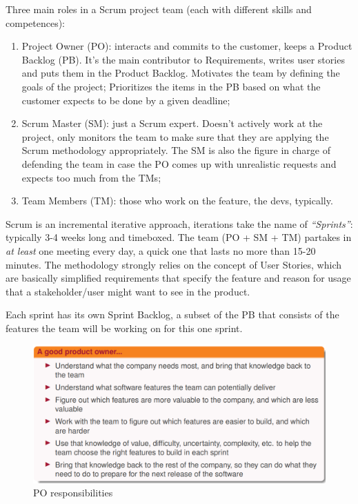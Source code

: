 Three main roles in a Scrum project team (each with different skills and competences):
\begin{enumerate}
    \item Project Owner (PO): interacts and commits to the customer, keeps a Product Backlog (PB). It's the main contributor to Requirements, writes user stories and puts them in the Product Backlog. Motivates the team by defining the goals of the project; Prioritizes the items in the PB based on what the customer expects to be done by a given deadline;
    \item Scrum Master (SM): just a Scrum expert. Doesn't actively work at the project, only monitors the team to make sure that they are applying the Scrum methodology appropriately. The SM is also the figure in charge of defending the team in case the PO comes up with unrealistic requests and expects too much from the TMs;
    \item Team Members (TM): those who work on the feature, the devs, typically.
\end{enumerate}

Scrum is an incremental iterative approach, iterations take the name of \textit{``Sprints''}: typically 3-4 weeks long and timeboxed. The team (PO + SM + TM) partakes in \textit{at least} one meeting every day, a quick one that lasts no more than 15-20 minutes. The methodology strongly relies on the concept of User Stories, which are basically simplified requirements that specify the feature and reason for usage that a stakeholder/user might want to see in the product.

 \noindent Each sprint has its own Sprint Backlog, a subset of the PB that consists of the features the team will be working on for this one sprint.

\begin{figure} [H]
    \centering
    \includegraphics[scale=0.5]{Figures/02/po_resp.png}
    \caption{PO responsibilities}
    \label{fig:poresp}
\end{figure}

